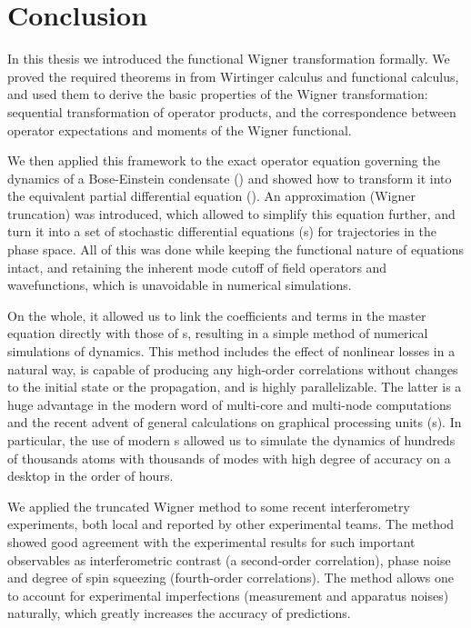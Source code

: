 \chapter{Conclusion}
\label{cha:conclusion}

In this thesis we introduced the functional Wigner transformation formally.
We proved the required theorems in from Wirtinger calculus and functional calculus, and used them to derive the basic properties of the Wigner transformation: sequential transformation of operator products, and the correspondence between operator expectations and moments of the Wigner functional.

We then applied this framework to the exact operator equation governing the dynamics of a Bose-Einstein condensate () and showed how to transform it into the equivalent partial differential equation ().
An approximation (Wigner truncation) was introduced, which allowed to simplify this equation further, and turn it into a set of stochastic differential equations (s) for trajectories in the phase space.
All of this was done while keeping the functional nature of equations intact, and retaining the inherent mode cutoff of field operators and wavefunctions, which is unavoidable in numerical simulations.

On the whole, it allowed us to link the coefficients and terms in the master equation directly with those of s, resulting in a simple method of numerical simulations of  dynamics.
This method includes the effect of nonlinear losses in a natural way, is capable of producing any high-order correlations without changes to the initial state or the propagation, and is highly parallelizable.
The latter is a huge advantage in the modern word of multi-core and multi-node computations and the recent advent of general calculations on graphical processing units (s).
In particular, the use of modern s allowed us to simulate the dynamics of hundreds of thousands atoms with thousands of modes with high degree of accuracy on a desktop in the order of hours.

We applied the truncated Wigner method to some recent  interferometry experiments, both local and reported by other experimental teams.
The method showed good agreement with the experimental results for such important observables as interferometric contrast (a second-order correlation), phase noise and degree of spin squeezing (fourth-order correlations).
The method allows one to account for experimental imperfections (measurement and apparatus noises) naturally, which greatly increases the accuracy of predictions.


